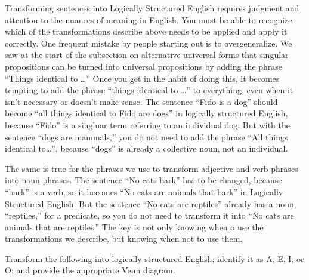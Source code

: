 Transforming sentences into Logically Structured English requires judgment and attention to the nuances of meaning in English. You must be able to recognize which of the transformations describe above needs to be applied and apply it correctly. One frequent mistake by people starting out is to overgeneralize. We saw at the start of the subsection on alternative universal forms that singular propositions can be turned into universal propositions by adding the phrase ``Things identical to \ldots'' Once you get in the habit of doing this, it becomes tempting to add the phrase ``things identical to \ldots'' to everything, even when it isn't necessary or doesn't make sense. The sentence ``Fido is a dog'' should become ``all things identical to Fido are dogs'' in logically structured English, because ``Fido'' is a singluar term referring to an individual dog. But with the sentence ``dogs are mammals,'' you do not need to add the phrase ``All things identical to\ldots'', because ``dogs'' is already a collective noun, not an individual.

The same is true for the phrases we use to transform adjective and verb phrases into noun phrases. The sentence ``No cats bark'' has to be changed, because ``bark'' is a verb, so it becomes ``No cats are animals that bark'' in Logically Structured English. But the sentence ``No cats are reptiles'' already has a noun, ``reptiles,'' for a predicate, so you do not need to transform it into ``No cats are animals that are reptiles.'' The key is not only knowing when o use the transformations we describe, but knowing when not to use them.



\practiceproblems
\noindent\problempart Transform the following into logically structured English; identify it as A, E, I, or O; and provide the appropriate Venn diagram.


